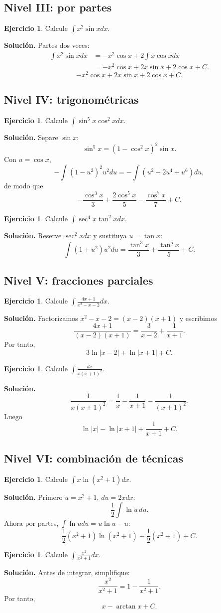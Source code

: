 \documentclass[12pt]{article}
\theoremstyle{definition}\newtheorem{definicion}[teorema]{Definición}\newtheorem{ejemplo}[teorema]{Ejemplo}\newtheorem{ejercicio}[teorema]{Ejercicio}
\theoremstyle{remark}\newtheorem*{observacion}{Observación}\newtheorem*{advertencia}{Advertencia}\newtheorem*{estrategia}{Estrategia}
\begin{document}
\subsection{Nivel III: por partes}
\begin{ejercicio}Calcule $\int x^2\sin xdx$.\end{ejercicio}
\textbf{Solución.} Partes dos veces:
\begin{align*}
\int x^2\sin xdx&=-x^2\cos x+2\int x\cos xdx\\
&=-x^2\cos x+2x\sin x+2\cos x+C.
\end{align*}
\[\boxed{-x^2\cos x+2x\sin x+2\cos x+C}.\]

\subsection{Nivel IV: trigonométricas}
\begin{ejercicio}Calcule $\int\sin^5x\cos^2xdx$.\end{ejercicio}
\textbf{Solución.} Separe $\sin x$:
\[\sin^5x=(1-\cos^2x)^2\sin x.\]
Con $u=\cos x$,
\[-\int(1-u^2)^2u^2du=-\int(u^2-2u^4+u^6)du,\]
de modo que
\[\boxed{-\frac{\cos^3x}{3}+\frac{2\cos^5x}{5}-\frac{\cos^7x}{7}+C}.\]
\begin{ejercicio}Calcule $\int\sec^4x\tan^2xdx$.\end{ejercicio}
\textbf{Solución.} Reserve $\sec^2x dx$ y sustituya $u=\tan x$:
\[\int(1+u^2)u^2du=\boxed{\frac{\tan^3x}{3}+\frac{\tan^5x}{5}+C}.\]

\subsection{Nivel V: fracciones parciales}
\begin{ejercicio}Calcule $\int\frac{4x+1}{x^2-x-2}dx$.\end{ejercicio}
\textbf{Solución.} Factorizamos $x^2-x-2=(x-2)(x+1)$ y escribimos
\[\frac{4x+1}{(x-2)(x+1)}=\frac{3}{x-2}+\frac1{x+1}.\]
Por tanto,
\[\boxed{3\ln|x-2|+\ln|x+1|+C}.\]
\begin{ejercicio}Calcule $\int\frac{dx}{x(x+1)^2}$.\end{ejercicio}
\textbf{Solución.}
\[\frac1{x(x+1)^2}=\frac1x-\frac1{x+1}-\frac1{(x+1)^2}.\]
Luego
\[\boxed{\ln|x|-\ln|x+1|+\frac1{x+1}+C}.\]

\subsection{Nivel VI: combinación de técnicas}
\begin{ejercicio}Calcule $\int x\ln(x^2+1)dx$.\end{ejercicio}
\textbf{Solución.} Primero $u=x^2+1$, $du=2xdx$:
\[\frac12\int\ln u\,du.\]
Ahora por partes, $\int\ln udu=u\ln u-u$:
\[\boxed{\frac12(x^2+1)\ln(x^2+1)-\frac12(x^2+1)+C}.\]
\begin{ejercicio}Calcule $\int\frac{x^2}{x^2+1}dx$.\end{ejercicio}
\textbf{Solución.} Antes de integrar, simplifique:
\[\frac{x^2}{x^2+1}=1-\frac1{x^2+1}.\]
Por tanto,
\[\boxed{x-\arctan x+C}.\]
\end{document}
